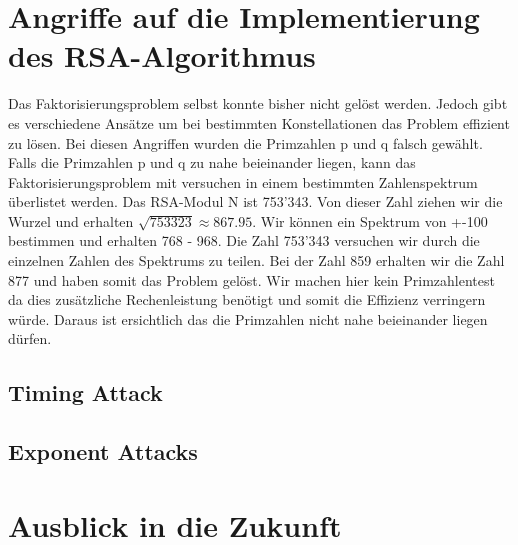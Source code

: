 \section{Angriffe auf die Implementierung des RSA-Algorithmus}
Das Faktorisierungsproblem selbst konnte bisher nicht gelöst werden. Jedoch gibt es verschiedene Ansätze um bei bestimmten Konstellationen das Problem effizient zu lösen. 
Bei diesen Angriffen wurden die Primzahlen p und q falsch gewählt.
Falls die Primzahlen p und q zu nahe beieinander liegen, kann das Faktorisierungsproblem mit versuchen in einem bestimmten Zahlenspektrum überlistet werden. Das RSA-Modul N ist 753'343. Von dieser Zahl ziehen wir die Wurzel und erhalten $ \sqrt{753323} \approx 867.95 $. Wir können  ein Spektrum von +-100 bestimmen und erhalten 768 - 968. Die Zahl 753'343 versuchen wir durch die einzelnen Zahlen des Spektrums zu teilen. Bei der Zahl 859 erhalten wir die Zahl 877 und haben somit das Problem gelöst. Wir machen hier kein Primzahlentest da dies zusätzliche Rechenleistung benötigt und somit die Effizienz verringern würde. Daraus ist ersichtlich das die Primzahlen nicht nahe beieinander liegen dürfen.%
%
\subsection{Timing Attack}
\subsection{Exponent Attacks}
\section{Ausblick in die Zukunft}
